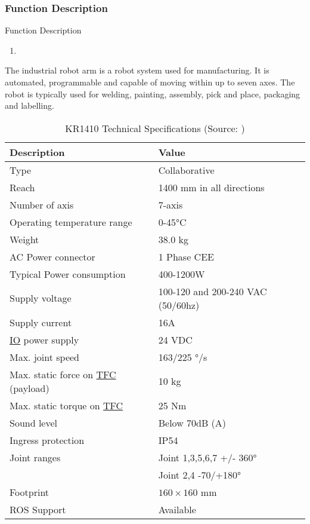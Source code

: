 \subsubsection{Function Description}
Function Description
\begin{enumerate}
    \item 
\end{enumerate}
The industrial robot arm is a robot system used for manufacturing. It is automated, programmable and
capable of moving within up to seven axes.
The robot is typically used for welding, painting, assembly, pick and place, packaging and labelling.
\begin{table}[h!]
    \centering
    \begin{tabular}{ll}
        \textbf{Description} & \textbf{Value} \\ \hline
        Type & Collaborative \\
        Reach & 1400 mm in all directions\\
        Number of axis & 7-axis \\
        Operating temperature range & 0-45°C\\ 
        Weight & 38.0 kg \\ 
        AC Power connector & 1 Phase CEE \\ 
        Typical Power consumption & 400-1200W \\ 
        Supply voltage & 100-120 and 200-240 VAC (50/60hz) \\ 
        Supply current & 16A\\ 
        \hyperref[acro:IO]{IO} power supply & 24 VDC\\ 
        Max. joint speed  & 163/225 °/s\\ 
        Max. static force on \hyperref[acro:TFC]{TFC} (payload) & 10 kg\\ 
        Max. static torque on \hyperref[acro:TFC]{TFC} & 25 Nm\\ 
        Sound level & Below 70dB (A) \\ 
        Ingress protection & IP54 \\ 
        Joint ranges & Joint 1,3,5,6,7 +/- 360° \\
        & Joint 2,4 -70/+180° \\ 
        Footprint& $160 \times 160$ mm \\ 
        ROS Support & Available \\ \hline
    \end{tabular}
    \caption{KR1410 Technical Specifications (Source: \cite[page 31]{kassow-specification})}
    \end{table}

